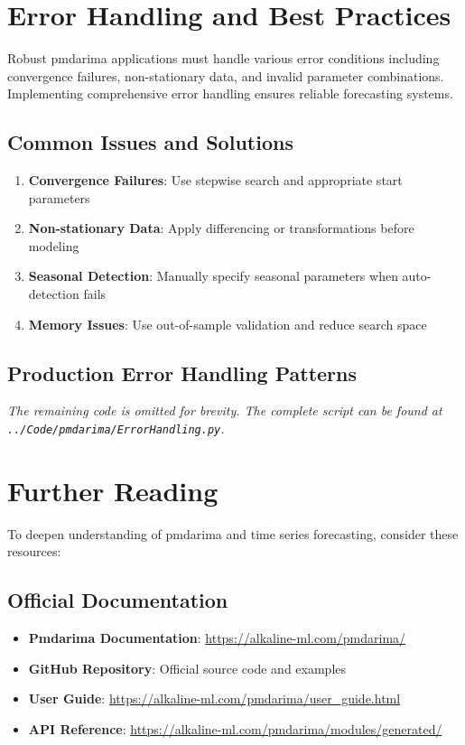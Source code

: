 \section{Error Handling and Best Practices}
\label{sec:best_practices}

Robust pmdarima applications must handle various error conditions including convergence failures, non-stationary data, and invalid parameter combinations. Implementing comprehensive error handling ensures reliable forecasting systems.

\subsection{Common Issues and Solutions}
\label{subsec:common_issues}

\begin{enumerate}
	\item \textbf{Convergence Failures}: Use stepwise search and appropriate start parameters
	\item \textbf{Non-stationary Data}: Apply differencing or transformations before modeling
	\item \textbf{Seasonal Detection}: Manually specify seasonal parameters when auto-detection fails
	\item \textbf{Memory Issues}: Use out-of-sample validation and reduce search space
\end{enumerate}

\subsection{Production Error Handling Patterns}
\label{subsec:error_patterns}


\noindent\textit{The remaining code is omitted for brevity. The complete script can be found at \texttt{../Code/pmdarima/ErrorHandling.py}.}

\section{Further Reading}
\label{sec:further_reading}

To deepen understanding of pmdarima and time series forecasting, consider these resources:

\subsection{Official Documentation}
\begin{itemize}
	\item \textbf{Pmdarima Documentation}: \url{https://alkaline-ml.com/pmdarima/}
	\item \textbf{GitHub Repository}: Official source code and examples \cite{Pmdarima:2024}
	\item \textbf{User Guide}: \url{https://alkaline-ml.com/pmdarima/user_guide.html}
	\item \textbf{API Reference}: \url{https://alkaline-ml.com/pmdarima/modules/generated/}
\end{itemize}


